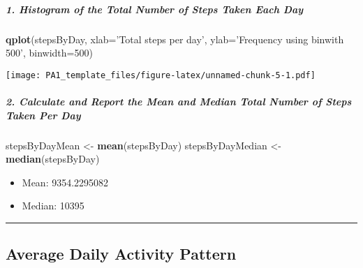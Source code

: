 \documentclass[]{article}
\newenvironment{Shaded}{\begin{snugshade}}{\end{snugshade}}
\newcommand{\KeywordTok}[1]{\textcolor[rgb]{0.13,0.29,0.53}{\textbf{#1}}}
\newcommand{\DataTypeTok}[1]{\textcolor[rgb]{0.13,0.29,0.53}{#1}}
\newcommand{\DecValTok}[1]{\textcolor[rgb]{0.00,0.00,0.81}{#1}}
\newcommand{\StringTok}[1]{\textcolor[rgb]{0.31,0.60,0.02}{#1}}
\newcommand{\OtherTok}[1]{\textcolor[rgb]{0.56,0.35,0.01}{#1}}
\newcommand{\OperatorTok}[1]{\textcolor[rgb]{0.81,0.36,0.00}{\textbf{#1}}}
\newcommand{\NormalTok}[1]{#1}
\providecommand{\tightlist}{%
  \setlength{\itemsep}{0pt}\setlength{\parskip}{0pt}}
\let\oldsubparagraph\subparagraph
\renewcommand{\subparagraph}[1]{\oldsubparagraph{#1}\mbox{}}
\begin{document}
\begin{Shaded}
\end{Shaded}

\subparagraph{1. Histogram of the Total Number of Steps Taken Each
Day}\label{histogram-of-the-total-number-of-steps-taken-each-day}

\begin{Shaded}
\begin{Highlighting}[]
\KeywordTok{qplot}\NormalTok{(stepsByDay, }\DataTypeTok{xlab=}\StringTok{'Total steps per day'}\NormalTok{, }\DataTypeTok{ylab=}\StringTok{'Frequency using binwith 500'}\NormalTok{, }\DataTypeTok{binwidth=}\DecValTok{500}\NormalTok{)}
\end{Highlighting}
\end{Shaded}

\texttt{[image: PA1\_template\_files/figure-latex/unnamed-chunk-5-1.pdf]}

\subparagraph{2. Calculate and Report the Mean and Median Total Number
of Steps Taken Per
Day}\label{calculate-and-report-the-mean-and-median-total-number-of-steps-taken-per-day}

\begin{Shaded}
\begin{Highlighting}[]
\NormalTok{stepsByDayMean <-}\StringTok{ }\KeywordTok{mean}\NormalTok{(stepsByDay)}
\NormalTok{stepsByDayMedian <-}\StringTok{ }\KeywordTok{median}\NormalTok{(stepsByDay)}
\end{Highlighting}
\end{Shaded}

\begin{itemize}
\tightlist
\item
  Mean: 9354.2295082
\item
  Median: 10395
\end{itemize}

\begin{center}\rule{0.5\linewidth}{\linethickness}\end{center}

\subsection{Average Daily Activity
Pattern}\label{average-daily-activity-pattern}
\end{document}
